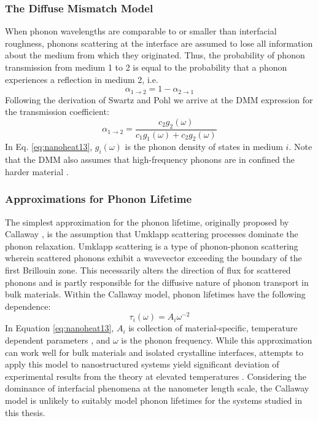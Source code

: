 \subsubsection{The Diffuse Mismatch Model}
When phonon wavelengths are comparable to or smaller than interfacial roughness, phonons scattering at the interface are assumed to lose all information about the medium from which they originated. Thus, the probability of phonon transmission from medium 1 to 2 is equal to the probability that a phonon experiences a reflection in medium 2, i.e.
\begin{equation}\label{eq:nanoheat13}
\alpha_{1 \rightarrow 2} = 1 - \alpha_{2 \rightarrow 1}
\end{equation}
Following the derivation of Swartz and Pohl \cite{RevModPhys.61.605} we arrive at the DMM expression for the transmission coefficient:
\begin{equation}\label{eq:nanoheat13}
\alpha_{1 \rightarrow 2} = \frac{c_2g_2\left(\omega\right)}{c_1g_1\left(\omega\right) + c_2g_2\left(\omega\right)}
\end{equation}
In Eq. \ref{eq:nanoheat13}, $g_i\left(\omega\right)$ is the phonon density of states in medium $i$. Note that the DMM also assumes that high-frequency phonons are in confined the harder material \cite{PhysRevB.86.094303}. 
\subsubsection{Approximations for Phonon Lifetime}
The simplest approximation for the phonon lifetime, originally proposed by Callaway \cite{PhysRev.113.1046}, is the assumption that Umklapp scattering processes dominate the phonon relaxation. Umklapp scattering is a type of phonon-phonon scattering wherein scattered phonons exhibit a wavevector exceeding the boundary of the first Brillouin zone. This necessarily alters the direction of flux for scattered phonons and is partly responsible for the diffusive nature of phonon transport in bulk materials. Within the Callaway model, phonon lifetimes have the following dependence:
\begin{equation}\label{eq:nanoheat13}
\tau_i(\omega) = A_i\omega^{-2}
\end{equation}
In Equation \ref{eq:nanoheat13}, $A_i$ is collection of material-specific, temperature dependent parameters \cite{PhysRevB.86.094303}, and $\omega$ is the phonon frequency. While this approximation can work well for bulk materials and isolated crystalline interfaces, attempts to apply this model to nanostructured systems yield significant deviation of experimental results from the theory at elevated temperatures \cite{liu2006thermal}. Considering the dominance of interfacial phenomena at the nanometer length scale, the Callaway model is unlikely to suitably model phonon lifetimes for the systems studied in this thesis. 
